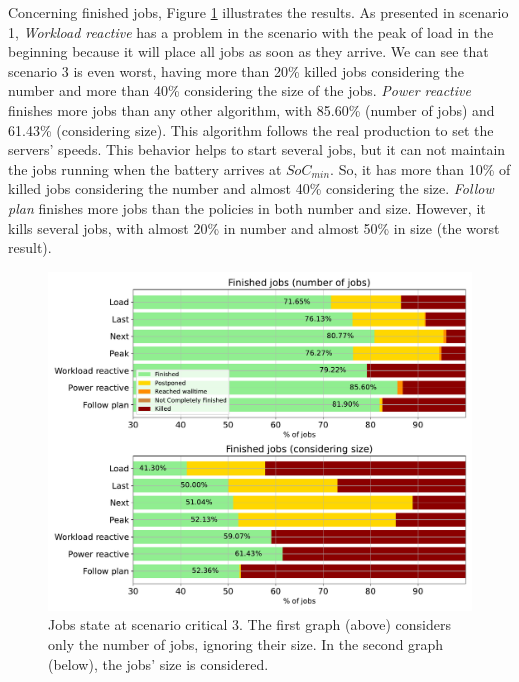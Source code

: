 Concerning finished jobs, Figure \ref{fig:jobs_critical_3} illustrates the results. As presented in scenario 1, \emph{Workload reactive} has a problem in the scenario with the peak of load in the beginning because it will place all jobs as soon as they arrive. We can see that scenario 3 is even worst, having more than 20\% killed jobs considering the number and more than 40\% considering the size of the jobs. \emph{Power reactive} finishes more jobs than any other algorithm, with 85.60\% (number of jobs) and 61.43\% (considering size). This algorithm follows the real production to set the servers' speeds. This behavior helps to start several jobs, but it can not maintain the jobs running when the battery arrives at $SoC_{min}$. So, it has more than 10\% of killed jobs considering the number and almost 40\% considering the size. \emph{Follow plan} finishes more jobs than the policies in both number and size. However, it kills several jobs, with almost 20\% in number and almost 50\% in size (the worst result). 

\begin{figure}[!htb]
    \centering
    \includegraphics[scale=0.55]{Images/Compensations/jobs_critical_3.pdf}
    \caption{Jobs state at scenario critical 3. The first graph (above) considers only the number of jobs, ignoring their size. In the second graph (below), the jobs' size is considered.}
    \label{fig:jobs_critical_3}
\end{figure}

